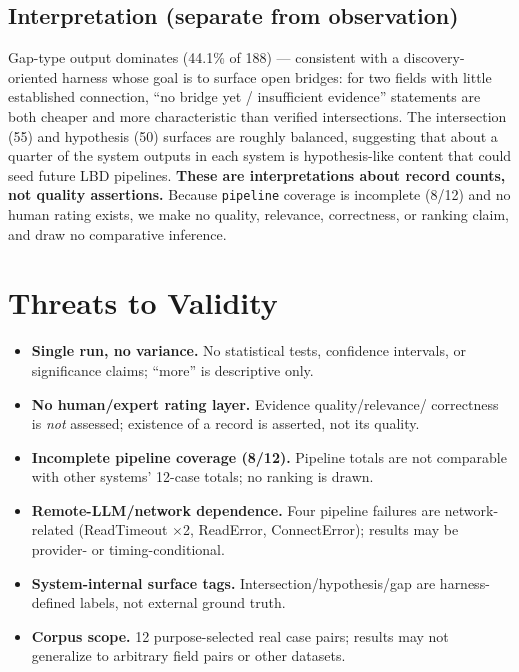 \documentclass[11pt]{article}
\begin{document}
\subsection{Interpretation (separate from observation)}
Gap-type output dominates (44.1\% of 188) --- consistent with a discovery-oriented
harness whose goal is to surface open bridges: for two fields with little
established connection, ``no bridge yet / insufficient evidence'' statements are
both cheaper and more characteristic than verified intersections. The
intersection (55) and hypothesis (50) surfaces are roughly balanced, suggesting
that about a quarter of the system outputs in each system is hypothesis-like
content that could seed future LBD pipelines. \textbf{These are interpretations
about record counts, not quality assertions.} Because \texttt{pipeline} coverage is
incomplete (8/12) and no human rating exists, we make no quality, relevance,
correctness, or ranking claim, and draw no comparative inference.

\section{Threats to Validity}
\label{sec:threats}
\begin{itemize}
\item \textbf{Single run, no variance.} No statistical tests, confidence
      intervals, or significance claims; ``more'' is descriptive only.
\item \textbf{No human/expert rating layer.} Evidence quality/relevance/
      correctness is \emph{not} assessed; existence of a record is asserted, not
      its quality.
\item \textbf{Incomplete pipeline coverage (8/12).} Pipeline totals are not
      comparable with other systems' 12-case totals; no ranking is drawn.
\item \textbf{Remote-LLM/network dependence.} Four pipeline failures are
      network-related (ReadTimeout $\times$2, ReadError, ConnectError); results
      may be provider- or timing-conditional.
\item \textbf{System-internal surface tags.} Intersection/hypothesis/gap are
      harness-defined labels, not external ground truth.
\item \textbf{Corpus scope.} 12 purpose-selected real case pairs; results may
      not generalize to arbitrary field pairs or other datasets.
\end{itemize}
\end{document}
